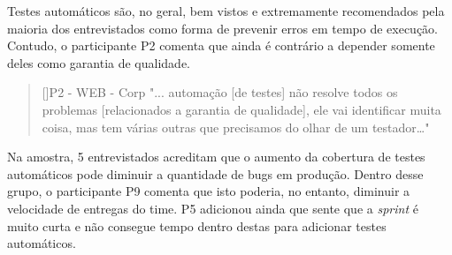 Testes automáticos são, no geral, bem vistos e extremamente recomendados pela maioria dos entrevistados como forma de prevenir erros em tempo de execução. Contudo, o participante P2 comenta que ainda é contrário a depender somente deles como garantia de qualidade.

\begin{quotation}[]{P2 - WEB - Corp}
    "... automação [de testes] não resolve todos os problemas [relacionados a garantia de qualidade], ele vai identificar muita coisa, mas tem várias outras que precisamos do olhar de um testador…"
\end{quotation}

Na amostra, 5 entrevistados acreditam que o aumento da cobertura de testes automáticos pode diminuir a quantidade de bugs em produção. Dentro desse grupo, o participante P9 comenta que isto poderia, no entanto, diminuir a velocidade de entregas do time. P5 adicionou ainda que sente que a \emph{sprint} é muito curta e não consegue tempo dentro destas para adicionar testes automáticos.
